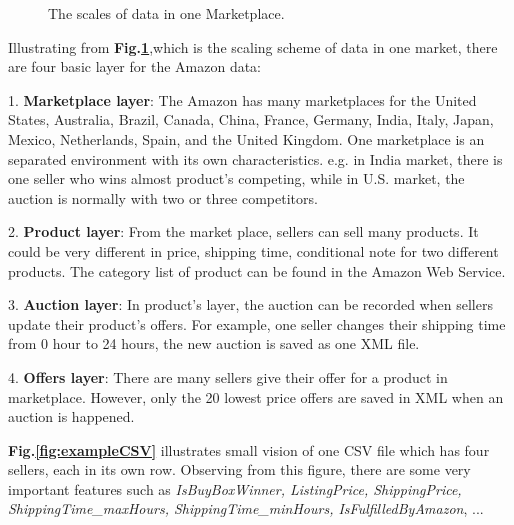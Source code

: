 \begin{figure}[!h]
	\begin{center}
	\end{center}
	\caption{\label{fig:scale}The scales of data in one Marketplace.}
\end{figure}

Illustrating from \textbf{Fig.\ref{fig:scale}},which is the scaling scheme of data in one market, there are four basic layer for the Amazon data:

1. \textbf{Marketplace layer}: The Amazon has many marketplaces for
the United States, Australia, Brazil, Canada, China, France, Germany, India, Italy, Japan, Mexico, Netherlands, Spain, and the United Kingdom. One marketplace is an separated  environment with its own characteristics.  e.g. in India market, there is one seller who wins almost product's competing, while in U.S. market, the auction is normally with two or three competitors.

2. \textbf{Product layer}: From the market place, sellers can sell many products. It could be very different in price, shipping time, conditional note for two different products. The category list of product can be found in the Amazon Web Service.

3. \textbf{Auction layer}: In product's layer, the auction can be recorded when sellers update their product's offers. For example, one seller changes their shipping time from 0 hour to 24 hours, the new auction is saved as one XML file.

4. \textbf{Offers layer}: There are many  sellers give their offer for a product in marketplace. However, only the 20 lowest price offers are saved in XML when an auction is happened.


\textbf{Fig.\ref{fig:exampleCSV}} illustrates small vision of one CSV file
which has four sellers, each in its own row. Observing from this figure, there are some very important features such as \textit{IsBuyBoxWinner, ListingPrice, ShippingPrice, ShippingTime\_maxHours, ShippingTime\_minHours, IsFulfilledByAmazon}, ... 

